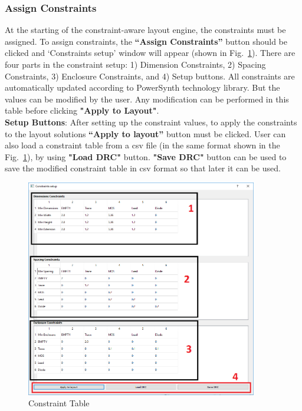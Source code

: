\documentclass[11pt]{article}
\begin{document}
\subsubsection{Assign Constraints}
\label{sec-2-6-2}
At the starting of the constraint-aware layout engine, the constraints must be assigned. To assign constraints, the \textbf{“Assign Constraints”} button should be clicked and ‘Constraints setup’ window will appear (shown in Fig.~\ref{const}). There are four parts in the constraint setup: 1) Dimension Constraints, 2) Spacing Constraints, 3) Enclosure Constraints, and 4) Setup buttons. All constraints are automatically updated according to PowerSynth technology library. But the values can be modified by the user. Any modification can be performed in this table before clicking \textbf{"Apply to Layout"}.\\
\textbf{Setup Buttons}: After setting up the constraint values, to apply the constraints to the layout solutions \textbf{“Apply to layout”} button must be clicked. User can also load a constraint table from a csv file (in the same format shown in the Fig.~\ref{const}), by using \textbf{"Load DRC"} button. \textbf{"Save DRC"} button can be used to save the modified constraint table in csv format so that later it can be used.

\begin{figure}[t]
\centering

\includegraphics[width=0.9\textwidth]{./figs/cons_assign.PNG}
\caption{Constraint Table}
\label{const}
\end{figure}
\end{document}
